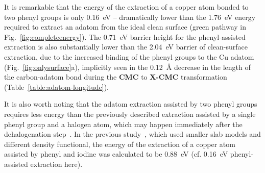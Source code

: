 \documentclass[aps,prb,amsmath,amssymb,11pt]{revtex4-1}
\newcommand{\zhzh}{\color{blue}}
\newcommand{\zhzh}{\color{blue}}
\newcommand{\comm}{\color{purple}} %
\begin{document}
It is remarkable that the energy of the extraction of a copper atom bonded to two phenyl groups is only \SI{0.16}{\electronvolt} -- dramatically lower than the \SI{1.76}{\electronvolt} energy required to extract an adatom from the ideal clean surface (green pathway in Fig.~\ref{fig:completeenergy}). The \SI{0.71}{\electronvolt} barrier height for the phenyl-assisted extraction is also substantially lower than the \SI{2.04}{\electronvolt} barrier of clean-surface extraction, due to the increased binding of the phenyl groups to the Cu adatom (Fig.~\ref{fig:onlysurface}a), implicitly seen in the \SI{0.12}{\angstrom} decrease in the length of the carbon-adatom bond during the \textbf{CMC} to \textbf{X-CMC} transformation (Table~\ref{table:adatom-longitude}).

It is also worth noting that the adatom extraction assisted by two phenyl groups requires less energy than the previously described extraction assisted by a single phenyl group and a halogen atom, which may happen immediately after the dehalogenation step~\cite{chemeurope2017}. 
In the previous study~\cite{chemeurope2017}, which used smaller slab models and different density functional, the energy of the extraction of a copper atom assisted by phenyl and iodine was calculated to be \SI{0.88}{\electronvolt} (cf. \SI{0.16}{\electronvolt}  phenyl-assisted extraction here). %
\end{document}
